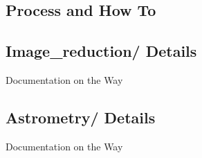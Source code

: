 \documentclass{article}
\begin{document}
\begin{enumerate}
\section{Process and How To}
\subsection{Image\_reduction/ Details}
Documentation on the Way
\subsection{Astrometry/ Details}
Documentation on the Way





\end{enumerate}
\end{document}

